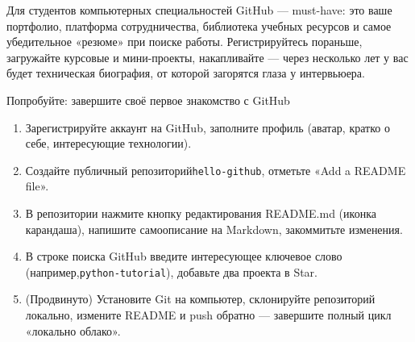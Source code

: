 Для студентов компьютерных специальностей GitHub — must-have: это ваше портфолио, платформа сотрудничества, библиотека учебных ресурсов и самое убедительное «резюме» при поиске работы. Регистрируйтесь пораньше, загружайте курсовые и мини-проекты, накапливайте — через несколько лет у вас будет техническая биография, от которой загорятся глаза у интервьюера.

\begin{tcbpractice}{Попробуйте: завершите своё первое знакомство с GitHub}
\begin{enumerate}
  \item Зарегистрируйте аккаунт на GitHub, заполните профиль (аватар, кратко о себе, интересующие технологии).
  \item Создайте публичный репозиторий\texttt{hello-\allowbreak github}, отметьте «Add a README file».
  \item В репозитории нажмите кнопку редактирования README.md (иконка карандаша), напишите самоописание на Markdown, закоммитьте изменения.
  \item В строке поиска GitHub введите интересующее ключевое слово (например,\texttt{python-\allowbreak tutorial}), добавьте два проекта в Star.
  \item (Продвинуто) Установите Git на компьютер, склонируйте репозиторий локально, измените README и push обратно — завершите полный цикл «локально облако».
\end{enumerate}

\end{tcbpractice}
